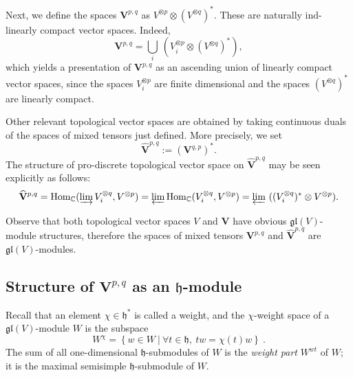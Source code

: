 \documentclass[12pt,reqno]{amsart}
\newcommand{\Hom}{\mathrm{Hom}}
\theoremstyle{definition}
\theoremstyle{remark}
\begin{document}
	Next, we define the spaces $\mathbf{V}^{p,q}$ as $V^{\otimes p}\otimes (V^{\otimes q})^*$. These are naturally ind-linearly compact vector spaces. Indeed,
	$$
	\mathbf{V}^{p,q} = \bigcup_i \ (V_i ^{\otimes p}\otimes (V^{\otimes q})^*),
	$$
	which yields a presentation of $\mathbf{V}^{p,q}$ as an ascending union of linearly compact vector spaces, since the spaces $V_i ^{\otimes p}$ are finite dimensional and the spaces $(V^{\otimes q})^*$ are linearly compact.
	
	Other relevant topological vector spaces are obtained by taking continuous duals of the spaces of mixed tensors just defined. More precisely, we set 
	$$
	\widehat{\mathbf{V}}^{p,q}
	:= 
	(\mathbf{V}^{q,p})^{\ast}.
	$$
	The structure of pro-discrete topological vector space on $ \widehat{\mathbf{V}}^{p,q}$ may be seen explicitly as follows:
	$$
	\widehat{\mathbf{V}}^{p,q} = \Hom_{\mathbb{C}} (\varinjlim V_i^{\otimes q}, V^{\otimes p}) = 
	\varprojlim \Hom_{\mathbb{C}} ( V_i ^{\otimes q},  V^{\otimes p}) = \varprojlim \ ( (V_i ^{\otimes q})^\ast\otimes V^{\otimes p}).
	$$
	
	Observe that both topological vector spaces $V$ and $\mathbf{V}$ have obvious  $\mathfrak{gl}(V)$-module structures, therefore the spaces of mixed tensors $\mathbf{V}^{p,q}$ and $\widehat{\mathbf{V}}^{p,q}$ are $ \mathfrak{gl}(V) $-modules.
	
	\subsection{Structure of $\mathbf{V}^{p,q}$ as an $\mathfrak{h}$-module}
	Recall that an element $\chi\in \mathfrak{h}^\ast$ is called a weight, and the $\chi$-weight space of a $\mathfrak{gl}(V)$-module $W$ is the subspace
	$$
	W^\chi = \left\{ w\in W \ | \ \forall t\in\mathfrak{h}, \ tw = \chi(t)w \right\} \ .
	$$
	The sum of all one-dimensional $\mathfrak{h}$-submodules of $W$ is the \textit{weight part} $W^{wt}$ of $W$; it is the maximal semisimple $\mathfrak{h}$-submodule of $W$.
	
\end{document}
